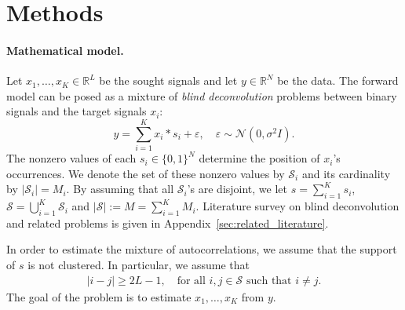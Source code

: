 \documentclass[english,11pt]{article}
\newcommand{\1}{\mathbf{1}}
\numberwithin{equation}{section}
\theoremstyle{plain}
\theoremstyle{definition}
\theoremstyle{remark}
\theoremstyle{plain}
\theoremstyle{remark}
\theoremstyle{plain}
\theoremstyle{plain}
\newcommand{\RL}{\mathbb{R}^L}
\newcommand{\RN}{\mathbb{R}^N}
\newcommand{\SNR}{\ensuremath{\textsf{SNR}}}
\begin{document}
\section{Methods} \label{sec:methods}


\paragraph{Mathematical model.}

Let $x_1,\ldots,x_K\in\RL$ be the sought signals and let $y\in\RN$ be the data. 
The forward model can be posed as a mixture of \emph{blind deconvolution} problems between binary signals and the target signals $x_i$:
\begin{equation} \label{eq:model}
y = \sum_{i=1}^K x_i\ast s_i + \varepsilon,\quad \varepsilon\sim\mathcal{N}(0,\sigma^2 I).
\end{equation}
The nonzero values of each  $s_i\in\{0,1\}^N$ determine the position of $x_i$'s occurrences. 
We denote the set of these nonzero values by 
 $\mathcal{S}_i$ and its cardinality by $\vert \mathcal{S}_i\vert = M_i$. 
By assuming that all $\mathcal{S}_i$'s are disjoint,  we let $s = \sum_{i=1}^Ks_i$, $\mathcal{S} = \bigcup_{i=1}^{K} \mathcal{S}_i$ and  $\vert \mathcal{S}\vert :=M =  \sum_{i=1}^{K}M_i$.  %
 Literature survey on blind deconvolution and related problems is given in Appendix~\ref{sec:related_literature}.

In order to estimate the mixture of autocorrelations, we assume that the support of $s$ is not clustered. In particular, we assume that
\begin{align}
  \vert i-j \vert\geq 2L-1,   \quad \text{for all } i,j\in\mathcal{S} \text{ such that } i\neq j.
  \label{eq:spacing}
\end{align}
The goal of the problem is to estimate $x_1,\ldots,x_K$ from $y$.


%
%
\end{document}
